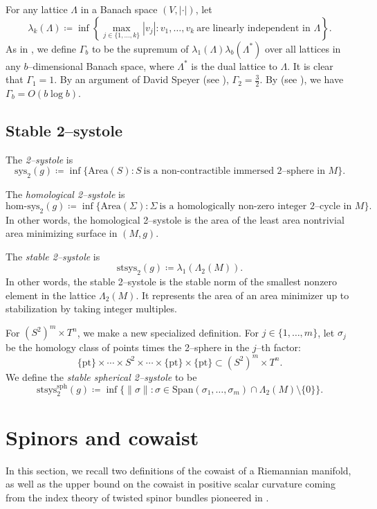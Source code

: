 \documentclass[12pt]{amsart}
\theoremstyle{definition}
\numberwithin{equation}{section}
\begin{document}
For any lattice $\Lambda$ in a Banach space $(V, |\cdot|)$, let
\[ \lambda_k(\Lambda) \coloneq \inf\left\{\max_{j \in \{1, \hdots, k\}} |v_j| : v_1, \hdots, v_k\ \text{are\ linearly\ independent\ in\ } \Lambda\right\}. \]
As in \cite[\S2]{GHK:systole}, we define $\Gamma_b$ to be the supremum of $\lambda_1(\Lambda)\lambda_b(\Lambda^*)$ over all lattices in any $b$--dimensional Banach space, where $\Lambda^*$ is the dual lattice to $\Lambda$. It is clear that $\Gamma_1 = 1$. By an argument of David Speyer (see \cite[Proposition 2.3]{GHK:systole}), $\Gamma_2 = \frac{3}{2}$. By \cite{Banaszczyk:gamma} (see \cite[\S2]{GHK:systole}), we have $\Gamma_b = O(b \log b)$.

\subsection{Stable 2--systole}\label{sec:def-sys}
The \emph{2--systole} is
\[ \mathrm{sys}_2(g) \coloneq \inf\{\mathrm{Area}(S) : S\ \text{is\ a\ non-contractible\ immersed\ 2--sphere\ in\ } M\}. \]

The \emph{homological 2--systole} is
\[ \mathrm{hom}\text{-}\mathrm{sys}_2(g) \coloneq \inf\{\mathrm{Area}(\Sigma) : \Sigma\ \text{is\ a\ homologically\ non-zero\ integer\ 2--cycle\ in\ } M\}. \]
In other words, the homological 2--systole is the area of the least area nontrivial area minimizing surface in $(M, g)$.

The \emph{stable 2--systole} is
\[ \mathrm{stsys}_2(g) \coloneq \lambda_1(\Lambda_2(M)). \]
In other words, the stable 2--systole is the stable norm of the smallest nonzero element in the lattice $\Lambda_2(M)$. It represents the area of an area minimizer up to stabilization by taking integer multiples.

For $(S^2)^m \times T^n$, we make a new specialized definition. For $j \in \{1, \hdots, m\}$, let $\sigma_j$ be the homology class of points times the 2--sphere in the $j$--th factor:
\[ \{\mathrm{pt}\} \times \cdots \times S^2 \times \cdots \times \{\mathrm{pt}\} \times \{\mathrm{pt}\} \subset (S^2)^m \times T^n. \]
We define the \emph{stable spherical 2--systole} to be
\[ \mathrm{stsys}_2^{\mathrm{sph}}(g) \coloneq \inf\{\|\sigma\| : \sigma \in \mathrm{Span}(\sigma_1, \hdots, \sigma_m) \cap \Lambda_2(M) \setminus \{0\}\}. \]







\section{Spinors and cowaist}\label{sec:spin}
In this section, we recall two definitions of the cowaist of a Riemannian manifold, as well as the upper bound on the cowaist in positive scalar curvature coming from the index theory of twisted spinor bundles pioneered in \cite{Gromov-Lawson:closed}.
\end{document}
